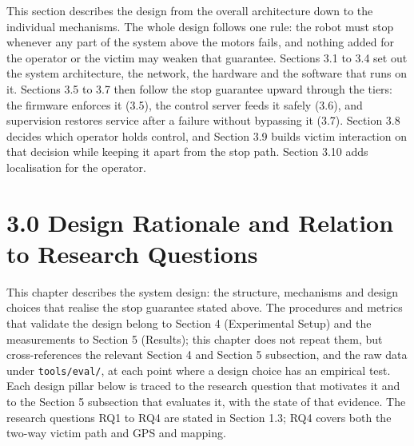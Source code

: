 This section describes the design from the overall architecture down to the individual mechanisms. The whole design follows one rule: the robot must stop whenever any part of the system above the motors fails, and nothing added for the operator or the victim may weaken that guarantee. Sections 3.1 to 3.4 set out the system architecture, the network, the hardware and the software that runs on it. Sections 3.5 to 3.7 then follow the stop guarantee upward through the tiers: the firmware enforces it (3.5), the control server feeds it safely (3.6), and supervision restores service after a failure without bypassing it (3.7). Section 3.8 decides which operator holds control, and Section 3.9 builds victim interaction on that decision while keeping it apart from the stop path. Section 3.10 adds localisation for the operator.

\section*{3.0 Design Rationale and Relation to Research Questions}

This chapter describes the system design: the structure, mechanisms and design choices that realise the stop guarantee stated above. The procedures and metrics that validate the design belong to Section 4 (Experimental Setup) and the measurements to Section 5 (Results); this chapter does not repeat them, but cross-references the relevant Section 4 and Section 5 subsection, and the raw data under \texttt{tools/eval/}, at each point where a design choice has an empirical test. Each design pillar below is traced to the research question that motivates it and to the Section 5 subsection that evaluates it, with the state of that evidence. The research questions RQ1 to RQ4 are stated in Section 1.3; RQ4 covers both the two-way victim path and GPS and mapping.

